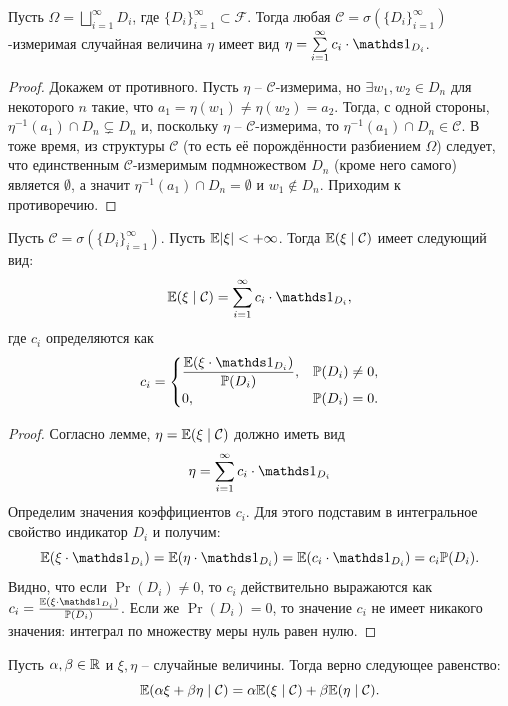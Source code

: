 \begin{lemma}
    Пусть $\Omega = \bigsqcup\limits_{i = 1}^{\infty} D_i$, где $\{D_i\}_{i = 1}^\infty \subset \mathcal{F}$. Тогда любая $\mathcal{C} = \sigma(\{D_i\}_{i = 1}^{\infty})$-измеримая случайная величина $\eta$ имеет вид $\eta = \sum\limits_{i = 1}^\infty c_i\cdot \Ind_{D_i}$.
\end{lemma}
\begin{proof}
    Докажем от противного. Пусть $\eta$ -- $\mathcal{C}$-измерима, но $\exists w_1, w_2 \in D_n$ для некоторого $n$ такие, что $a_1 = \eta(w_1) \neq \eta(w_2) = a_2$. Тогда, с одной стороны, $\eta^{-1}(a_1) \cap D_n \subsetneq D_n$ и, поскольку $\eta$ -- $\mathcal{C}$-измерима, то $\eta^{-1}(a_1) \cap D_n \in \mathcal{C}$. В тоже время, из структуры $\mathcal{C}$ (то есть её порождённости разбиением $\Omega$) следует, что единственным $\mathcal{C}$-измеримым подмножеством $D_n$ (кроме него самого) является $\emptyset$, а значит $\eta^{-1}(a_1) \cap D_n = \emptyset$ и $w_1 \notin D_n$. Приходим к противоречию.
\end{proof}
\begin{theorem}
    Пусть $\mathcal{C} = \sigma(\{D_i\}_{i = 1}^{\infty})$. Пусть $\mathbb{E}|\xi| < +\infty$. 
    Тогда $\mathbb{E}(\xi \mid \mathcal{C})$ имеет следующий вид:
    \[
        \Ex(\xi \mid \mathcal{C}) = \sum\limits_{i = 1}^\infty c_i \cdot \Ind_{D_i},
    \]
    где $c_i$ определяются как
    \[
        c_i = 
        \begin{cases}
            \dfrac{\Ex(\xi \cdot \Ind_{D_i})}{\Pr(D_i)}, & \Pr(D_i) \neq 0, \\
            0, & \Pr(D_i) = 0.
        \end{cases}
    \]
\end{theorem}
\begin{proof}
    Согласно лемме, $\eta = \mathbb{E}(\xi \mid \mathcal{C})$ должно иметь вид
    \[
        \eta = \sum\limits_{i = 1}^{\infty} c_i \cdot \Ind_{D_i}
    \]
    Определим значения коэффициентов $c_i$. Для этого подставим в интегральное свойство индикатор $D_i$ и получим:
    \[
        \Ex(\xi \cdot \Ind_{D_i}) = \Ex(\eta \cdot \Ind_{D_i}) = \Ex(c_i \cdot \Ind_{D_i}) = c_i \Pr(D_i).
    \]
    Видно, что если $\Pr(D_i) \neq 0$, то $c_i$ действительно выражаются как $c_i = \frac{\Ex(\xi \cdot \Ind_{D_i})}{\Pr(D_i)}$. Если же $\Pr(D_i) = 0$, то значение $c_i$ не имеет никакого значения: интеграл по множеству меры нуль равен нулю.
\end{proof}
\begin{property}
    Пусть $\alpha, \beta \in \mathbb{R}$ и $\xi, \eta$ -- случайные величины. 
    Тогда верно следующее равенство:
    \[
        \mathbb{E}(\alpha \xi + \beta \eta \mid \mathcal{C}) = \alpha \mathbb{E}(\xi \mid \mathcal{C}) + \beta \mathbb{E}(\eta \mid \mathcal{C}).
    \]
\end{property}
